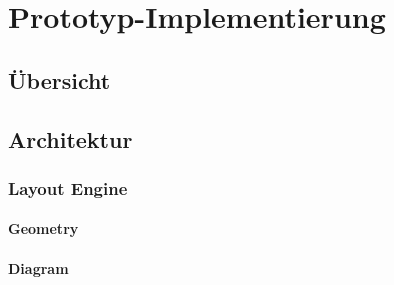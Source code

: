 
\chapter{Prototyp-Implementierung}
\label{chapter:prototype}

\section{Übersicht}






\section{Architektur}


\subsection{Layout Engine}


\subsubsection{Geometry}


\subsubsection{Diagram}

